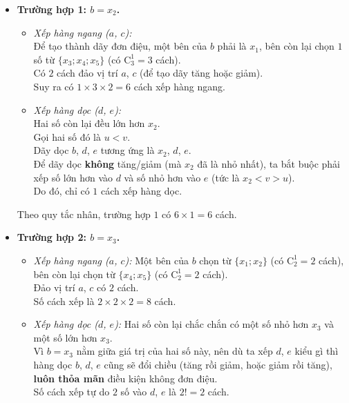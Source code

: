 \begin{ex}
{\begin{center}
		\end{center}
		\begin{itemize}
			\item \textbf{Trường hợp 1: $b = x_2$.}
			\begin{itemize}
				\item \textit{Xếp hàng ngang ($a$, $c$):}\\
				Để tạo thành dãy đơn điệu, một bên của $b$ phải là $x_1$, bên còn lại chọn $1$ số từ $\{x_3; x_4; x_5\}$ (có $\mathrm{C}_3^1 = 3$ cách).\\ Có $2$ cách đảo vị trí $a$, $c$ (để tạo dãy tăng hoặc giảm).\\ Suy ra có $1 \times 3 \times 2 = 6$ cách xếp hàng ngang.
				\item \textit{Xếp hàng dọc ($d$, $e$):}\\ Hai số còn lại đều lớn hơn $x_2$.\\ Gọi hai số đó là $u < v$.\\ Dãy dọc $b$, $d$, $e$ tương ứng là $x_2$, $d$, $e$.\\ Để dãy dọc \textbf{không} tăng/giảm (mà $x_2$ đã là nhỏ nhất), ta bắt buộc phải xếp số lớn hơn vào $d$ và số nhỏ hơn vào $e$ (tức là $x_2 < v > u$).\\ Do đó, chỉ có $1$ cách xếp hàng dọc.
			\end{itemize}
			Theo quy tắc nhân, trường hợp $1$ có $6 \times 1 = 6$ cách.
			\item \textbf{Trường hợp 2: $b = x_3$.}
			\begin{itemize}
				\item \textit{Xếp hàng ngang ($a$, $c$):} Một bên của $b$ chọn từ $\{x_1; x_2\}$ (có $\mathrm{C}_2^1 = 2$ cách), bên còn lại chọn từ $\{x_4; x_5\}$ (có $\mathrm{C}_2^1 = 2$ cách).\\ Đảo vị trí $a$, $c$ có $2$ cách.\\ Số cách xếp là $2 \times 2 \times 2 = 8$ cách.
				\item \textit{Xếp hàng dọc ($d$, $e$):} Hai số còn lại chắc chắn có một số nhỏ hơn $x_3$ và một số lớn hơn $x_3$.\\ Vì $b=x_3$ nằm giữa giá trị của hai số này, nên dù ta xếp $d$, $e$ kiểu gì thì hàng dọc $b$, $d$, $e$ cũng sẽ đổi chiều (tăng rồi giảm, hoặc giảm rồi tăng), \textbf{luôn thỏa mãn} điều kiện không đơn điệu.\\ Số cách xếp tự do $2$ số vào $d$, $e$ là $2! = 2$ cách.

\end{itemize}
\end{itemize}}
\end{ex}

